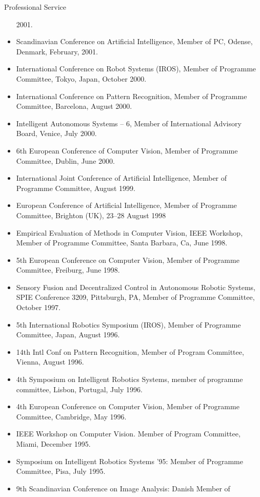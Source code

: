 \documentclass{article}
\begin{document}
\begin{cv}
\begin{cvlist}{Professional Service}
\begin{itemize}
    2001.
  \item Scandinavian Conference on Artificial Intelligence, Member of
    PC, Odense, Denmark, February, 2001.
  \item International Conference on Robot Systems (IROS), Member of
    Programme Committee,  Tokyo, Japan, October 2000.
  \item International Conference on Pattern Recognition, Member of
    Programme Committee, Barcelona, August 2000.
  \item Intelligent Autonomous Systems -- 6, Member of
    International Advisory Board, Venice, July 2000.
  \item 6th European Conference of Computer Vision, Member of Programme
    Committee, Dublin, June 2000.
  \item International Joint Conference of Artificial Intelligence,
    Member of Programme Committee, August 1999.
  \item European Conference of Artificial Intelligence, Member of
    Programme Committee, Brighton (UK), 23--28 August 1998
  \item Empirical Evaluation of Methods in Computer Vision, IEEE
    Workshop, Member of Programme Committee, Santa Barbara, Ca, June
    1998.
  \item 5th European Conference on Computer Vision, Member of Programme
    Committee, Freiburg, June 1998.
  \item Sensory Fusion and Decentralized Control in Autonomous Robotic
    Systems, SPIE Conference 3209, Pittsburgh, PA, Member of Programme
    Committee, October 1997.
  \item 5th International Robotics Symposium (IROS), Member of Programme
    Committee, Japan, August 1996.
  \item 14th Intl Conf on Pattern Recognition, Member of Program
    Committee, Vienna, August 1996.
  \item 4th Symposium on Intelligent Robotics Systems, member of
    programme committee, Lisbon, Portugal, July 1996.
  \item 4th European Conference on Computer Vision, Member of Programme
    Committee, Cambridge, May 1996.
  \item IEEE Workshop on Computer Vision. Member of Program Committee,
    Miami, December 1995.
  \item Symposium on Intelligent Robotics Systems '95: Member of
    Programme Committee, Pisa, July 1995.
  \item 9th Scandinavian Conference on Image Analysis: Danish Member of

\end{itemize}
\end{cvlist}
\end{cv}
\end{document}

